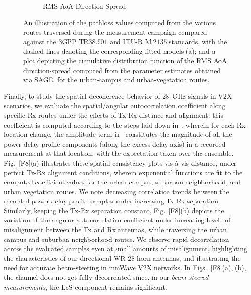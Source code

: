 \documentclass[12pt, draftcls, onecolumn]{IEEEtran}
\begin{document}
\begin{figure} [t]
\begin{subfigure}{0.505\linewidth}
         \caption{RMS AoA Direction Spread}
         \label{F7b}
     \end{subfigure}
     \vspace{-2mm}
     \caption{An illustration of the pathloss values computed from the various routes traversed during the measurement campaign compared against the $3$GPP TR$38.901$ and ITU-R M.$2135$ standards, with the dashed lines denoting the corresponding fitted models (a); and a plot depicting the cumulative distribution function of the RMS AoA direction-spread computed from the parameter estimates obtained via SAGE, for the urban-campus and urban-vegetation routes.}
     \label{F7}
\end{figure}

Finally, to study the spatial decoherence behavior of \SI{28}{\giga\hertz} signals in V$2$X scenarios, we evaluate the spatial/angular autocorrelation coefficient along specific Rx routes under the effects of Tx-Rx distance and alignment: this coefficient is computed according to the steps laid down in~\cite{MacCartneySpatialStatistics}, wherein for each Rx location change, the amplitude term in~\cite{MacCartneySpatialStatistics} constitutes the magnitude of all the power-delay profile components (along the excess delay axis) in a recorded measurement at that location, with the expectation taken over the ensemble. Fig.~\ref{F8}(a) illustrates these spatial consistency plots vis-\`{a}-vis distance, under perfect Tx-Rx alignment conditions, wherein exponential functions are fit to the computed coefficient values for the urban campus, suburban neighborhood, and urban vegetation routes. We note decreasing correlation trends between the recorded power-delay profile samples under increasing Tx-Rx separation. Similarly, keeping the Tx-Rx separation constant, Fig.~\ref{F8}(b) depicts the variation of the angular autocorrelation coefficient under increasing levels of misalignment between the Tx and Rx antennas, while traversing the urban campus and suburban neighborhood routes. We observe rapid decorrelation across the evaluated samples even at small amounts of misalignment, highlighting the characteristics of our directional WR-$28$ horn antennas, and illustrating the need for accurate beam-steering in mmWave V$2$X networks. In Figs.~\ref{F8}(a), (b), the channel does not get fully decorrelated since, in our \emph{beam-steered measurements}, the LoS component remains significant.
\vspace{-4mm}

\end{document}

